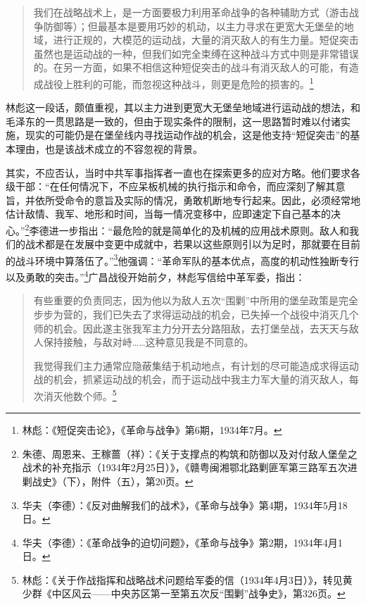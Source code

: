 \begin{quote}

我们在战略战术上，是一方面要极力利用革命战争的各种辅助方式（游击战争防御等）；但最基本是要用巧妙的机动，以主力寻求在更宽大无堡垒的地域，进行正规的，大模范的运动战，大量的消灭敌人的有生力量。短促突击虽然也是运动战的一种，但我们如完全束缚在这种战斗方式中则是非常错误的。在另一方面，如果不相信这种短促突击的战斗有消灭敌人的可能，有造成战役上胜利的可能，而忽视这种战斗，则更是危险的损害的。\footnote{林彪：《短促突击论》，《革命与战争》第6期，1934年7月。}
\end{quote}


林彪这一段话，颇值重视，其以主力进到更宽大无堡垒地域进行运动战的想法，和毛泽东的一贯思路是一致的，但由于现实条件的限制，这一思路暂时难以付诸实施，现实的可能仍是在堡垒线内寻找运动作战的机会，这是他支持“短促突击”的基本理由，也是该战术成立的不容忽视的背景。


其实，不应否认，当时中共军事指挥者一直也在探索更多的应对方略。他们要求各级干部：“在任何情况下，不应呆板机械的执行指示和命令，而应深刻了解其意旨，并依所受命令的意旨及实际的情况，勇敢机断地专行起来。因此，必须经常地估计敌情、我军、地形和时间，当每一情况变移中，应即速定下自己基本的决心。”\footnote{朱德、周恩来、王稼蔷（祥）：《关于支撑点的构筑和防御以及对付敌人堡垒之战术的补充指示（1934年2月25日）》，《赣粤闽湘鄂北路剿匪军第三路军五次进剿战史》（下），附件（五），第20页。}李德进一步指出：“最危险的就是简单化的及机械的应用战术原则。敌人和我们的战术都是在发展中变更中成就中，若果以这些原则引以为足时，那就要在目前的战斗环境中算落伍了。”\footnote{华夫（李德）：《反对曲解我们的战术》，《革命与战争》第4期，1934年5月18日。}他强调：“革命军队的基本优点，高度的机动性独断专行以及勇敢的突击。”\footnote{华夫（李德）：《革命战争的迫切问题》，《革命与战争》第2期，1934年4月1日。}广昌战役开始前夕，林彪写信给中革军委，指出：

\begin{quote}

有些重要的负责同志，因为他以为敌人五次“围剿”中所用的堡垒政策是完全步步为营的，我们已失去了求得运动战的机会，已失掉一个战役中消灭几个师的机会。因此遂主张我军主力分开去分路阻敌，去打堡垒战，去天天与敌人保持接触，与敌对峙……这种意见我是不同意的。

我觉得我们主力通常应隐蔽集结于机动地点，有计划的尽可能造成求得运动战的机会，抓紧运动战的机会，而于运动战中我主力军大量的消灭敌人，每次消灭他数个师。\footnote{林彪：《关于作战指挥和战略战术问题给军委的信（1934年4月3日）》，转见黄少群《中区风云——中央苏区第一至第五次反“围剿”战争史》，第326页。}
\end{quote}


